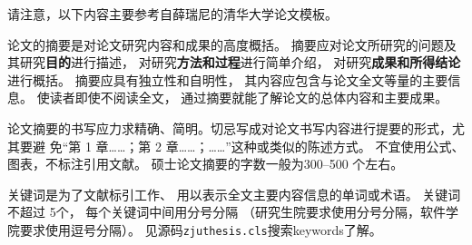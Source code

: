 
\begin{cabstract}
请注意，以下内容主要参考自薛瑞尼的清华大学论文模板。

论文的摘要是对论文研究内容和成果的高度概括。
摘要应对论文所研究的问题及其研究\textbf{目的}进行描述，
对研究\textbf{方法和过程}进行简单介绍，
对研究\textbf{成果和所得结论}进行概括。
摘要应具有独立性和自明性，
其内容应包含与论文全文等量的主要信息。
使读者即使不阅读全文，
通过摘要就能了解论文的总体内容和主要成果。

论文摘要的书写应力求精确、简明。切忌写成对论文书写内容进行提要的形式，尤其要避
免“第 1 章……；第 2 章……；……”这种或类似的陈述方式。
不宜使用公式、图表，不标注引用文献。
硕士论文摘要的字数一般为300--500 个左右。

关键词是为了文献标引工作、
用以表示全文主要内容信息的单词或术语。
关键词不超过 5个，
每个关键词中间用分号分隔
（研究生院要求使用分号分隔，软件学院要求使用逗号分隔）。
见源码\texttt{zjuthesis.cls}搜索keywords了解。
\end{cabstract}

